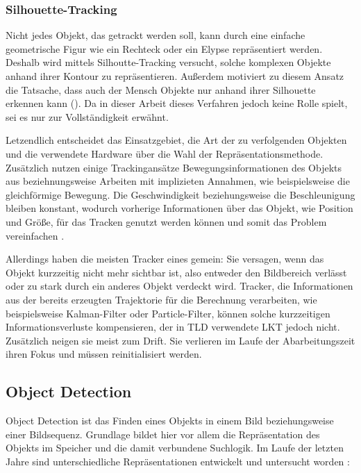 \subsubsection{Silhouette-Tracking}
Nicht jedes Objekt, das getrackt werden soll, kann durch eine einfache geometrische Figur wie ein Rechteck oder ein Elypse repräsentiert werden. Deshalb wird mittels Silhoutte-Tracking versucht, solche komplexen Objekte anhand ihrer Kontour zu repräsentieren. Außerdem motiviert zu diesem Ansatz die Tatsache, dass auch der Mensch Objekte nur anhand ihrer Silhouette erkennen kann (). Da in dieser Arbeit dieses Verfahren jedoch keine Rolle spielt, sei es nur zur Vollständigkeit erwähnt.

Letzendlich entscheidet das Einsatzgebiet, die Art der zu verfolgenden Objekten und die verwendete Hardware über die Wahl der Repräsentationsmethode. Zusätzlich nutzen einige Trackingansätze Bewegungsinformationen des Objekts aus beziehnungsweise Arbeiten mit implizieten Annahmen, wie beispielsweise die gleichförmige Bewegung. Die Geschwindigkeit beziehungsweise die Beschleunigung bleiben konstant, wodurch vorherige Informationen über das Objekt, wie Position und Größe, für das Tracken genutzt werden können und somit das Problem vereinfachen \cite{OTS}.

Allerdings haben die meisten Tracker eines gemein: Sie versagen, wenn das Objekt kurzzeitig nicht mehr sichtbar ist, also entweder den Bildbereich verlässt oder zu stark durch ein anderes Objekt verdeckt wird. Tracker, die Informationen aus der bereits erzeugten Trajektorie für die Berechnung verarbeiten, wie beispielsweise Kalman-Filter \cite{KAF} oder Particle-Filter\cite{PAF}, können solche kurzzeitigen Informationsverluste kompensieren, der in TLD verwendete LKT jedoch nicht. Zusätzlich neigen sie meist zum Drift. Sie verlieren im Laufe der Abarbeitungszeit ihren Fokus und müssen reinitialisiert werden.

\subsection{Object Detection}
Object Detection ist das Finden eines Objekts in einem Bild beziehungsweise einer Bildsequenz. Grundlage bildet hier vor allem die Repräsentation des Objekts im Speicher und die damit verbundene Suchlogik. Im Laufe der letzten Jahre sind unterschiedliche Repräsentationen entwickelt und untersucht worden \cite{OTS}:

